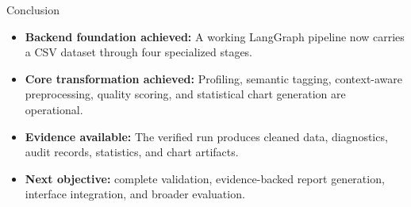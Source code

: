 
\begin{frame}{Conclusion}
    \begin{itemize}
        \item \textbf{Backend foundation achieved:} A working LangGraph pipeline now carries a CSV dataset through four specialized stages.
        \item \textbf{Core transformation achieved:} Profiling, semantic tagging, context-aware preprocessing, quality scoring, and statistical chart generation are operational.
        \item \textbf{Evidence available:} The verified run produces cleaned data, diagnostics, audit records, statistics, and chart artifacts.
        \item \textbf{Next objective:} complete validation, evidence-backed report generation, interface integration, and broader evaluation.
    \end{itemize}
\end{frame}
